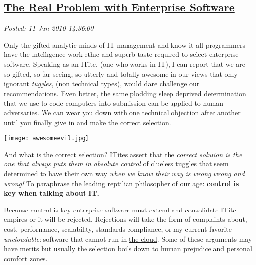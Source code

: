 %

\subsection*{\href{http://bakerjd99.wordpress.com/2010/06/11/the-real-problem-with-enterprise-software/}{The Real Problem with Enterprise Software}}


\noindent\emph{Posted: 11 Jun 2010 14:36:00}
\vspace{6pt}

Only the gifted analytic minds of IT management and know it all
programmers have the intelligence work ethic and superb taste required
to select enterprise software. Speaking as an ITite, (one who works in
IT), I can report that we are so gifted, so far-seeing, so utterly and
totally awesome in our views that only ignorant
\emph{\href{http://www.urbandictionary.com/define.php?term=tuggles}{tuggles}},
(non technical types), would dare challenge our recommendations. Even
better, the same plodding sleep deprived determination that we use to
code computers into submission can be applied to human adversaries. We
can wear you down with one technical objection after another until you
finally give in and make the correct selection.

\captionsetup[floatingfigure]{labelformat=empty}
\begin{floatingfigure}[l]{0.30\textwidth}
\centering
\href{http://online.wsj.com/article/SB10001424052748704025304575285000265955016.html?KEYWORDS=dilbert}{\texttt{[image: awesomeevil.jpg]}}
\label{fig:570X0}
\end{floatingfigure}And what is the correct selection? ITites assert that the \emph{correct
solution is the one that always puts them in absolute control} of
clueless tuggles that seem determined to have their own way \emph{when
we know their way is wrong wrong and wrong!} To paraphrase the
\href{http://www.nytimes.com/2009/02/19/business/media/19adco.html}{leading
reptilian philosopher} of our age: \textbf{control is key when talking
about IT.}

Because control is key enterprise software must extend and consolidate
ITite empires or it will be rejected. Rejections will take the form of
complaints about, cost, performance, scalability, standards compliance,
or my current favorite \emph{uncloudable:} software that cannot run in
\href{http://en.wikipedia.org/wiki/Cloud\_computing}{the cloud}. Some of
these arguments may have merits but usually the selection boils down to
human prejudice and personal comfort zones.

